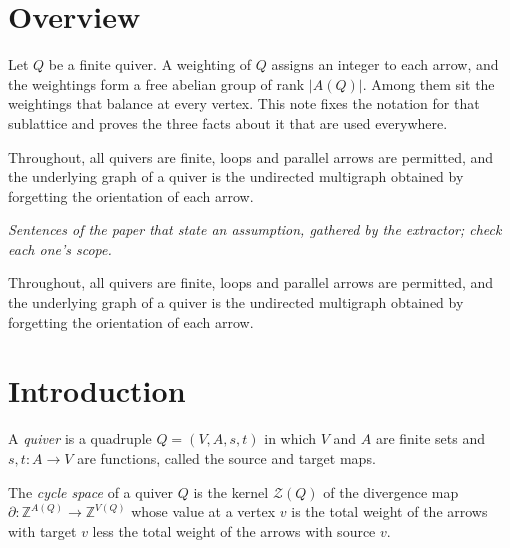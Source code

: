 
\section*{Overview}
Let $Q$ be a finite quiver. A weighting of $Q$ assigns an integer to each arrow, and the weightings form a free abelian group of rank $|A(Q)|$. Among them sit the weightings that balance at every vertex. This note fixes the notation for that sublattice and proves the three facts about it that are used everywhere.

Throughout, all quivers are finite, loops and parallel arrows are permitted, and the underlying graph of a quiver is the undirected multigraph obtained by forgetting the orientation of each arrow.

\begin{theorem}\label{Arden24-setup}
\emph{Sentences of the paper that state an assumption, gathered by the extractor; check each one's scope.}

Throughout, all quivers are finite, loops and parallel arrows are permitted, and the underlying graph of a quiver is the undirected multigraph obtained by forgetting the orientation of each arrow.
\end{theorem}

\section{Introduction}\label{Arden24-sec-1}

\begin{definition}\label{Arden24-def-1.1}
\label{Arden24-def:quiver}
A \emph{quiver} is a quadruple $Q = (V, A, s, t)$ in which $V$ and $A$ are finite sets and $s, t \colon A \to V$ are functions, called the source and target maps.
\end{definition}

\begin{definition}\label{Arden24-def-1.2}
\label{Arden24-def:cycle-space}
The \emph{cycle space} of a quiver $Q$ is the kernel $\mathcal{Z}(Q)$ of the divergence map $\partial \colon \mathbb{Z}^{A(Q)} \to \mathbb{Z}^{V(Q)}$ whose value at a vertex $v$ is the total weight of the arrows with target $v$ less the total weight of the arrows with source $v$.
\end{definition}

